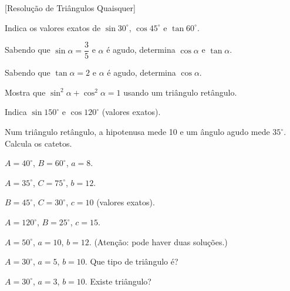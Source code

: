 \documentclass[12pt]{article}
\begin{document}
[Resolução de Triângulos Quaisquer]


\begin{center}
\end{center}

\begin{exercicios}
  \item Indica os valores exatos de $\sin 30^\circ$, $\cos 45^\circ$ e $\tan 60^\circ$.
  \item Sabendo que $\sin \alpha = \dfrac{3}{5}$ e $\alpha$ é agudo, determina $\cos \alpha$ e $\tan \alpha$.
  \item Sabendo que $\tan \alpha = 2$ e $\alpha$ é agudo, determina $\cos \alpha$.
  \item Mostra que $\sin^2 \alpha + \cos^2 \alpha = 1$ usando um triângulo retângulo.
  \item Indica $\sin 150^\circ$ e $\cos 120^\circ$ (valores exatos).
  \item Num triângulo retângulo, a hipotenusa mede 10 e um ângulo agudo mede $35^\circ$. Calcula os catetos.
\end{exercicios}

\begin{exercicios}
  \item $A = 40^\circ$, $B = 60^\circ$, $a = 8$.
  \item $A = 35^\circ$, $C = 75^\circ$, $b = 12$.
  \item $B = 45^\circ$, $C = 30^\circ$, $c = 10$ (valores exatos).
  \item $A = 120^\circ$, $B = 25^\circ$, $c = 15$.
  \item $A = 50^\circ$, $a = 10$, $b = 12$. (Atenção: pode haver duas soluções.)
  \item $A = 30^\circ$, $a = 5$, $b = 10$. Que tipo de triângulo é?
  \item $A = 30^\circ$, $a = 3$, $b = 10$. Existe triângulo?
\end{exercicios}
\end{document}
